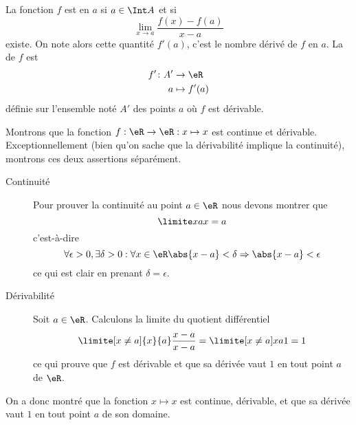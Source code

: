 \begin{definition}      \label{DEFooOYFZooFWmcAB}
	La fonction \( f\) est  en \( a\) si \( a \in\Int A\) et si
	\begin{equation*}
		\lim_{x\to a} \frac{f(x)-f(a)}{x-a}
	\end{equation*}
	existe. On note alors cette quantité \( f'(a)\), c'est le nombre
	dérivé de \( f\) en \( a\). La  de \( f\) est
	\begin{equation}
		\begin{aligned}
			f'\colon A' & \to \eR       \\
			a           & \mapsto f'(a)
		\end{aligned}
	\end{equation}
	définie sur l'ensemble noté \( A'\) des points \( a\) où \( f\) est dérivable.
\end{definition}

\begin{example}
	Montrons que la fonction \( f : \eR \to \eR : x\mapsto x\) est continue et dérivable. Exceptionnellement (bien qu'on sache que la dérivabilité implique la continuité), montrons ces deux assertions séparément.
	\begin{description}
		\item[Continuité] Pour prouver la continuité au point \( a \in \eR\) nous devons montrer que
		      \begin{equation}
			      \limite x a x = a
		      \end{equation}
		      c'est-à-dire
		      \begin{equation}
			      \forall \epsilon > 0, \exists \delta > 0 :  \forall x \in \eR \abs{x-a} <
			      \delta \Rightarrow \abs{x-a} < \epsilon
		      \end{equation}
		      ce qui est clair en prenant \( \delta = \epsilon\).

		\item[Dérivabilité] Soit \( a \in \eR\). Calculons la limite du quotient différentiel
		      \begin{equation}
			      \limite[x\neq a]{x}{a} \frac{x-a}{x-a} = \limite[x\neq a]x a 1 = 1
		      \end{equation}
		      ce qui prouve que \( f\) est dérivable et que sa dérivée vaut \( 1\) en
		      tout point \( a\) de \( \eR\).
	\end{description}

	On a donc montré que la fonction \( x \mapsto x\) est continue, dérivable, et que sa dérivée vaut \( 1\) en tout point \( a\) de son domaine.

\end{example}

